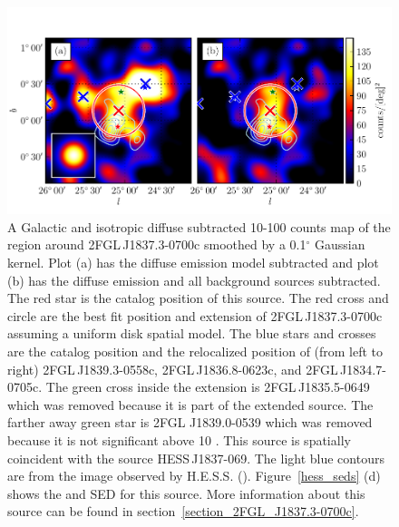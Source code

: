 \documentclass[12pt,preprint]{aastex}
\newcommand{\gev}{\text{GeV}\xspace}
\newcommand{\tev}{\text{TeV}\xspace}
\renewcommand{\deg}{\ensuremath{^\circ}\xspace}
\begin{document}
\begin{figure}
  \begin{center}
    \includegraphics[type=pdf,ext=.pdf,read=.pdf]{source_plots/source_1FGL_J1837.5-0659c}
  \end{center}
  \caption{
  A Galactic and isotropic diffuse subtracted 10-100 \gev counts map of
  the region around 2FGL\,J1837.3-0700c smoothed by a 0.1\deg Gaussian
  kernel.  Plot (a) has the diffuse emission model subtracted and plot (b)
  has the diffuse emission and all background sources subtracted.  The red
  star is the catalog position of this source. The red cross and circle
  are the best fit position and extension  of 2FGL\,J1837.3-0700c assuming
  a uniform disk spatial model.  The blue stars and crosses are the
  catalog position and the relocalized position of (from left to right)
  2FGL\,J1839.3-0558c, 2FGL\,J1836.8-0623c, and 2FGL\,J1834.7-0705c.
  The green cross inside the extension is 2FGL\,J1835.5-0649 which
  was removed because it is part of the extended source.  The farther
  away green star is 2FGL J1839.0-0539 which was removed because
  it is not significant above 10 \gev.  This source is spatially
  coincident with the \tev source HESS\,J1837-069.  The light blue contours are from the \tev image observed by H.E.S.S.
  (\cite{hess_plane_survey}).  Figure~\ref{hess_seds} (d) shows the \gev
  and \tev SED for this source.  More information about this source can
  be found in section~\ref{section_2FGL_J1837.3-0700c}.
  }\label{1FGL_J1837.5-0659c}
\end{figure}
\end{document}
